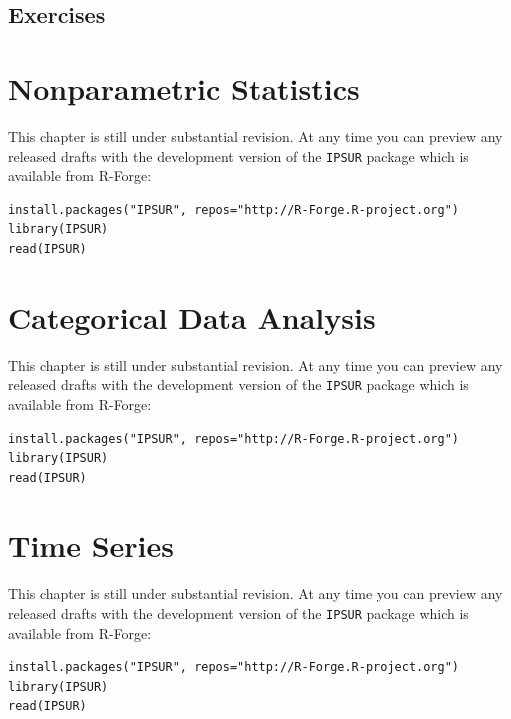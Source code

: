 \documentclass[captions=tableheading]{scrbook}
\begin{document}
\newpage{}
\section{Exercises}
\label{sec-13-5}

\setcounter{thm}{0}
\chapter{Nonparametric Statistics}
\label{sec-14}

\label{cha:Nonparametric-Statistics}

This chapter is still under substantial revision. At any time you can preview any released drafts with the development version of the \texttt{IPSUR} package which is available from \textsf{R}-Forge:


\begin{verbatim}
install.packages("IPSUR", repos="http://R-Forge.R-project.org")
library(IPSUR)
read(IPSUR)
\end{verbatim}
\chapter{Categorical Data Analysis}
\label{sec-15}

\label{cha:Categorical-Data-Analysis}

This chapter is still under substantial revision. At any time you can preview any released drafts with the development version of the \texttt{IPSUR} package which is available from \textsf{R}-Forge:


\begin{verbatim}
install.packages("IPSUR", repos="http://R-Forge.R-project.org")
library(IPSUR)
read(IPSUR)
\end{verbatim}
\chapter{Time Series}
\label{sec-16}

\label{cha:Time-Series}

This chapter is still under substantial revision. At any time you can preview any released drafts with the development version of the \texttt{IPSUR} package which is available from \textsf{R}-Forge:


\begin{verbatim}
install.packages("IPSUR", repos="http://R-Forge.R-project.org")
library(IPSUR)
read(IPSUR)
\end{verbatim}
\end{document}
